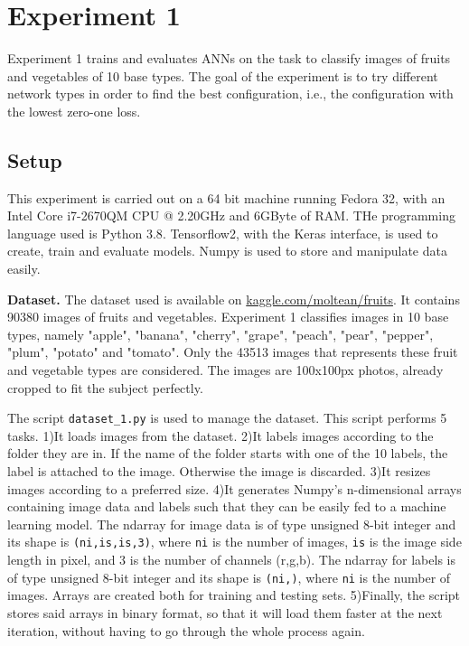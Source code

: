 \section{Experiment 1}
\label{sec:exp1}
Experiment 1 trains and evaluates ANNs on the task to classify images of fruits and vegetables of 10 base types. The goal of the experiment is to try different network types in order to find the best configuration, i.e., the configuration with the lowest zero-one loss.

\subsection{Setup}
This experiment is carried out on a 64 bit machine running Fedora 32, with an Intel\textsuperscript{\textregistered} Core\texttrademark{} i7-2670QM CPU @ 2.20GHz and 6GByte of RAM. THe programming language used is Python 3.8\cite{python3}. Tensorflow2\cite{tensorflow2015-whitepaper}, with the Keras\cite{chollet2015keras} interface, is used to create, train and evaluate models. Numpy\cite{harris2020array} is used to store and manipulate data easily.

\textbf{Dataset.}
The dataset used is available on \href{https://www.kaggle.com/moltean/fruits}{kaggle.com/moltean/fruits}. It contains 90380 images of fruits and vegetables. Experiment 1 classifies images in 10 base types, namely "apple", "banana", "cherry", "grape", "peach", "pear", "pepper", "plum", "potato" and "tomato". Only the 43513 images that represents these fruit and vegetable types are considered. The images are 100x100px photos, already cropped to fit the subject perfectly.

The script \texttt{dataset\_1.py} is used to manage the dataset. This script performs 5 tasks. 1)It loads images from the dataset. 2)It labels images according to the folder they are in. If the name of the folder starts with one of the 10 labels, the label is attached to the image. Otherwise the image is discarded. 3)It resizes images according to a preferred size. 4)It generates Numpy's n-dimensional arrays containing image data and labels such that they can be easily fed to a machine learning model. The ndarray for image data is of type unsigned 8-bit integer and its shape is \texttt{(ni,is,is,3)}, where \texttt{ni} is the number of images, \texttt{is} is the image side length in pixel, and 3 is the number of channels (r,g,b). The ndarray for labels is of type unsigned 8-bit integer and its shape is \texttt{(ni,)}, where \texttt{ni} is the number of images. Arrays are created both for training and testing sets. 5)Finally, the script stores said arrays in binary format, so that it will load them faster at the next iteration, without having to go through the whole process again.

